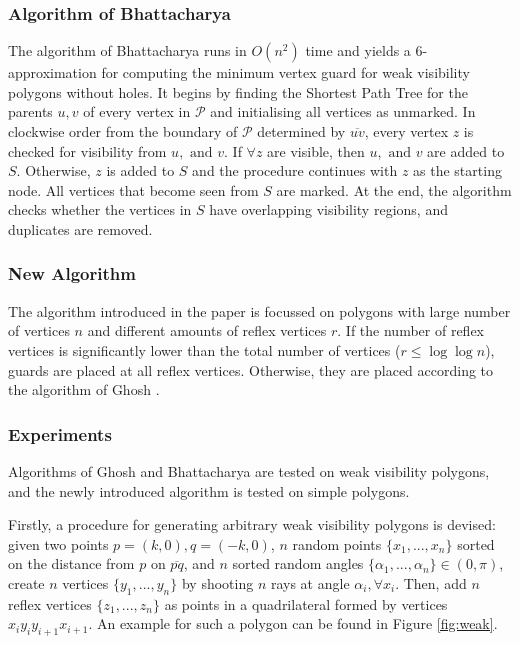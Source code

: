 \subsubsection{Algorithm of Bhattacharya \cite{bhattacharya2016approximability}}
The algorithm of Bhattacharya \cite{bhattacharya2016approximability} runs in $O(n^2)$ time and yields a 6-approximation for computing the minimum vertex guard for weak visibility polygons without holes. It begins by finding the Shortest Path Tree for the parents $u, v$ of every vertex in $\mathcal P$ and initialising all vertices as unmarked. In clockwise order from the boundary of $\mathcal P$ determined by $\overline{uv}$, every vertex $z$ is checked for visibility from $u, \text{ and } v$. If $\forall z$ are visible, then $u, \text{ and }v$ are added to $S$. Otherwise, $z$ is added to $S$ and the procedure continues with $z$ as the starting node. All vertices that become seen from $S$ are marked. At the end, the algorithm checks whether the vertices in $S$ have overlapping visibility regions, and duplicates are removed.

\subsubsection{New Algorithm}
The algorithm introduced in the paper is focussed on polygons with large number of vertices $n$ and different amounts of reflex vertices $r$. If the number of reflex vertices is significantly lower than the total number of vertices ($r \leq \log \log n$), guards are placed at all reflex vertices. Otherwise, they are placed according to the algorithm of Ghosh \cite{GHOSH2010718}.

\subsubsection{Experiments}
Algorithms of Ghosh \cite{GHOSH2010718} and Bhattacharya \cite{bhattacharya2016approximability} are tested on weak visibility polygons, and the newly introduced algorithm is tested on simple polygons. 

Firstly, a procedure for generating arbitrary weak visibility polygons is devised: given two points $p = (k, 0), q = (-k, 0)$,  $n$ random points $\{x_1, ..., x_n\}$ sorted on the distance from $p$ on $\overline{pq}$, and $n$ sorted random angles $\{\alpha_1, ..., \alpha_n\} \in  (0, \pi)$, create $n$ vertices $\{y_1, ..., y_n\}$ by shooting $n$ rays at angle $\alpha_i, \forall x_i$. Then, add $n$ reflex vertices $\{z_1, ..., z_n\}$ as points in a quadrilateral formed by vertices $x_iy_iy_{i + 1}x_{i + 1}$. An example for such a polygon can be found in Figure \ref{fig:weak}.

